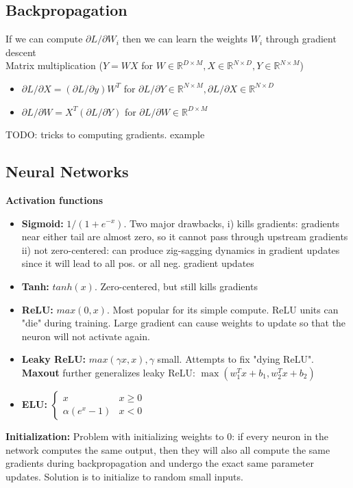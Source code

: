 \documentclass[9pt]{extarticle}
\begin{document}
\subsection{Backpropagation}
If we can compute $\partial L / \partial W_i$ then we can learn the weights $W_i$ through gradient descent\\
Matrix multiplication ($Y = WX$ for $W \in \mathbb{R}^{D\times M}, X \in \mathbb{R}^{N\times D}, Y\in \mathbb{R}^{N\times M}$)
\begin{itemize}
    \item $\partial L / \partial X = (\partial L / \partial y) W^T$ for $\partial L / \partial Y \in \mathbb{R}^{N\times M}, \partial L / \partial X \in \mathbb{R}^{N\times D}$
    \item $\partial L / \partial W = X^T(\partial L / \partial Y) $ for $\partial L / \partial W \in \mathbb{R}^{D\times M}$
\end{itemize}
TODO: tricks to computing gradients. example



\subsection{Neural Networks}
\textbf{Activation functions}
\begin{itemize}
    \item \textbf{Sigmoid:} $1 / (1 + e^{-x})$. Two major drawbacks,  i) kills gradients: gradients near either tail are almost zero, so it cannot pass through upstream gradients ii) not zero-centered: can produce zig-sagging dynamics in gradient updates since it will lead to all pos. or all neg. gradient updates
    \item \textbf{Tanh:} $tanh(x)$. Zero-centered, but still kills gradients
    \item \textbf{ReLU:} $max(0, x)$. Most popular for its simple compute. ReLU units can "die" during training. Large gradient can cause weights to update so that the neuron will not activate again. 
    \item \textbf{Leaky ReLU:} $max(\gamma x, x), \gamma$ small. Attempts to fix "dying ReLU". \textbf{Maxout} further generalizes leaky ReLU: $\max(w_1^Tx + b_1, w_2^Tx + b_2)$
    \item \textbf{ELU:} $\begin{cases} x & x \geq 0 \\ \alpha(e^x-1) & x < 0\end{cases}$
\end{itemize}
\textbf{Initialization:} Problem with initializing weights to 0: if every neuron in the network computes the same output, then they will also all compute the same gradients during backpropagation and undergo the exact same parameter updates. Solution is to initialize to random small inputs.\\
\end{document}
